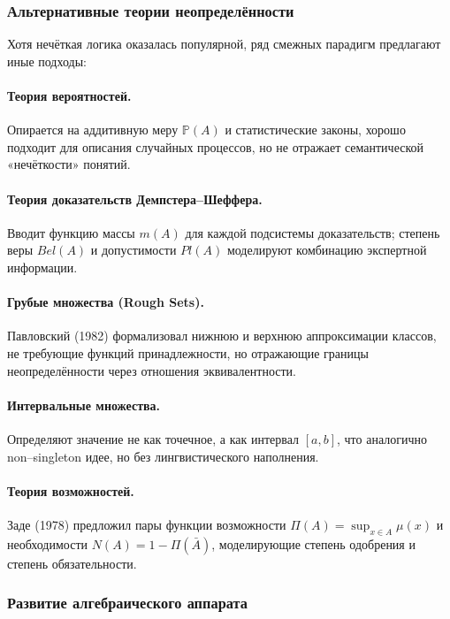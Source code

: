 \subsubsection{Альтернативные теории неопределённости}
\label{subsubsec:alt_uncertainty_expand}

Хотя нечёткая логика оказалась популярной, ряд смежных парадигм предлагают иные подходы:

\paragraph{Теория вероятностей.}  
Опирается на аддитивную меру $\mathbb{P}(A)$ и статистические законы, хорошо подходит для описания случайных процессов, но не отражает семантической «нечёткости» понятий.

\paragraph{Теория доказательств Демпстера–Шеффера.}  
Вводит функцию массы $m(A)$ для каждой подсистемы доказательств; степень веры $Bel(A)$ и допустимости $Pl(A)$ моделируют комбинацию экспертной информации.

\paragraph{Грубые множества (Rough Sets).}  
Павловский (1982) формализовал нижнюю и верхнюю аппроксимации классов, не требующие функций принадлежности, но отражающие границы неопределённости через отношения эквивалентности.

\paragraph{Интервальные множества.}  
Определяют значение не как точечное, а как интервал $[a,b]$, что аналогично non–singleton идее, но без лингвистического наполнения.

\paragraph{Теория возможностей.}  
Заде (1978) предложил пары функции возможности $\Pi(A)=\sup_{x\in A}\mu(x)$ и необходимости $N(A)=1-\Pi(\bar A)$, моделирующие степень одобрения и степень обязательности.

\subsubsection{Развитие алгебраического аппарата}
\label{subsubsec:algebraic_tools}

